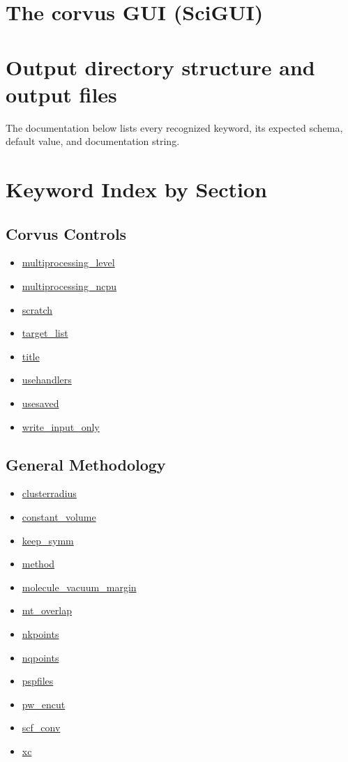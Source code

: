 \documentclass[11pt]{article}
\begin{document}
\section{The corvus GUI (SciGUI)}


\section{Output directory structure and output files}


The documentation below lists every recognized
keyword, its expected schema, default value,
and documentation string.



\section{Keyword Index by Section}

\subsection*{Corvus Controls}
\begin{itemize}
\item \hyperref[kw:multiprocessing-level]{multiprocessing\_level}
\item \hyperref[kw:multiprocessing-ncpu]{multiprocessing\_ncpu}
\item \hyperref[kw:scratch]{scratch}
\item \hyperref[kw:target-list]{target\_list}
\item \hyperref[kw:title]{title}
\item \hyperref[kw:usehandlers]{usehandlers}
\item \hyperref[kw:usesaved]{usesaved}
\item \hyperref[kw:write-input-only]{write\_input\_only}
\end{itemize}

\subsection*{General Methodology}
\begin{itemize}
\item \hyperref[kw:clusterradius]{clusterradius}
\item \hyperref[kw:constant-volume]{constant\_volume}
\item \hyperref[kw:keep-symm]{keep\_symm}
\item \hyperref[kw:method]{method}
\item \hyperref[kw:molecule-vacuum-margin]{molecule\_vacuum\_margin}
\item \hyperref[kw:mt-overlap]{mt\_overlap}
\item \hyperref[kw:nkpoints]{nkpoints}
\item \hyperref[kw:nqpoints]{nqpoints}
\item \hyperref[kw:pspfiles]{pspfiles}
\item \hyperref[kw:pw-encut]{pw\_encut}
\item \hyperref[kw:scf-conv]{scf\_conv}
\item \hyperref[kw:xc]{xc}
\end{itemize}
\end{document}
